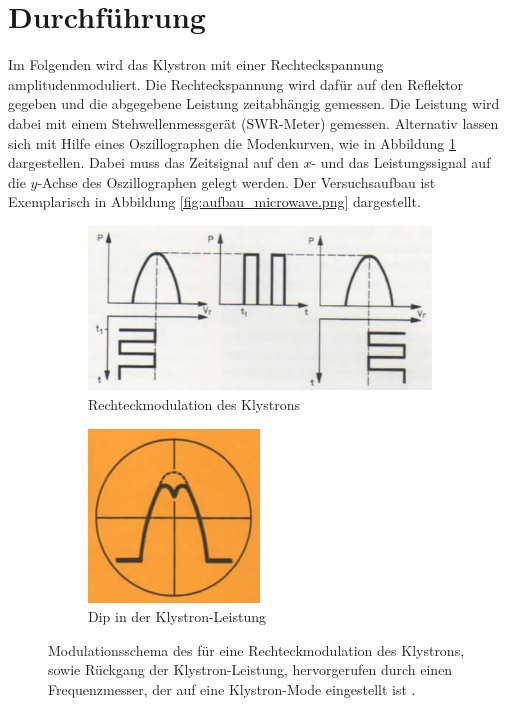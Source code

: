 \section{Durchführung}
Im Folgenden wird das Klystron mit einer Rechteckspannung amplitudenmoduliert.
Die Rechteckspannung wird dafür auf den Reflektor gegeben und die abgegebene
Leistung zeitabhängig gemessen.
Die Leistung wird dabei mit einem Stehwellenmessgerät (SWR-Meter) gemessen.
Alternativ lassen sich mit Hilfe eines Oszillographen die Modenkurven, wie in
Abbildung \ref{fig:moden} dargestellen.
Dabei muss das Zeitsignal auf den $x$- und das Leistungssignal auf die
$y$-Achse des Oszillographen gelegt werden.
Der Versuchsaufbau ist Exemplarisch in Abbildung \ref{fig:aufbau_microwave.png}
dargestellt.
\begin{figure}[p]
    \centering
    \begin{subfigure}{0.6\linewidth}
        \centering
        \includegraphics[width=0.8\linewidth]{img/moden.png}
        \caption{
            Rechteckmodulation des Klystrons
        }
        \label{fig:moden}
    \end{subfigure}
    \begin{subfigure}{0.39\linewidth}
        \centering
        \includegraphics[width=0.8\linewidth]{img/dip.png}
        \caption{
            Dip in der Klystron-Leistung
        }
        \label{fig:dip}
    \end{subfigure}
    \caption{
        Modulationsschema des für eine Rechteckmodulation des Klystrons,
        sowie Rückgang der Klystron-Leistung, hervorgerufen durch einen
        Frequenzmesser, der auf eine Klystron-Mode eingestellt ist
        \cite{V53}.
    }
    \label{fig:moden-dip}
\end{figure}
